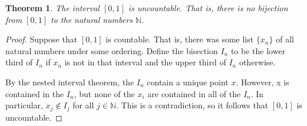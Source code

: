 \documentclass[12pt]{article}
\theoremstyle{definition}
\theoremstyle{plain}
\newtheorem{thm}{Theorem}
\begin{document}
\begin{thm}
The interval $[0, 1]$ is uncountable. That is, there is no bijection from $[0, 1]$ to the natural numbers $\mathbb{N}$.
\end{thm}

\begin{proof}
Suppose that $[0, 1]$ is countable. That is, there was some list $\{x_n\}$ of all natural numbers under some ordering. Define the bisection $I_n$ to be the lower third of $I_n$ if $x_n$ is not in that interval and the upper third of $I_n$ otherwise.

By the nested interval theorem, the $I_n$ contain a unique point $x$. However, x is contained in the $I_n$, but none of the $x_i$ are contained in all of the $I_n$. In particular, $x_j \not\in I_j$ for all $j \in \mathbb{N}$. This is a contradiction, so it follows that $[0, 1]$ is uncountable.
\end{proof}
\end{document}
